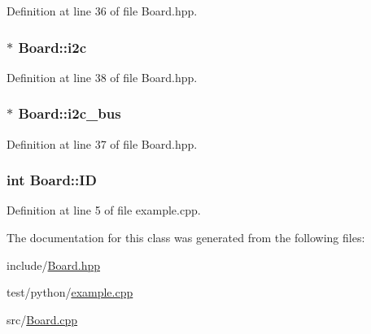 Definition at line 36 of file Board.\+hpp.

\subsubsection[{\texorpdfstring{i2c}{i2c}}]{$\ast$ Board\+::i2c\hspace{0.3cm}{\ttfamily [protected]}}\hypertarget{class_board_aec7b3a540a138062fc54587e1040d917}{}\label{class_board_aec7b3a540a138062fc54587e1040d917}


Definition at line 38 of file Board.\+hpp.

\subsubsection[{\texorpdfstring{i2c\+\_\+bus}{i2c_bus}}]{$\ast$ Board\+::i2c\+\_\+bus\hspace{0.3cm}{\ttfamily [protected]}}\hypertarget{class_board_a4458164bae62e6ba213a08a767242f9f}{}\label{class_board_a4458164bae62e6ba213a08a767242f9f}


Definition at line 37 of file Board.\+hpp.

\subsubsection[{\texorpdfstring{ID}{ID}}]{\setlength{\rightskip}{0pt plus 5cm}int Board\+::\+ID}\hypertarget{class_board_ac537a3646d93996bcf1c0ead77cf4ab5}{}\label{class_board_ac537a3646d93996bcf1c0ead77cf4ab5}


Definition at line 5 of file example.\+cpp.



The documentation for this class was generated from the following files\+:\begin{DoxyCompactItemize}
\item 
include/\hyperlink{_board_8hpp}{Board.\+hpp}\item 
test/python/\hyperlink{example_8cpp}{example.\+cpp}\item 
src/\hyperlink{_board_8cpp}{Board.\+cpp}\end{DoxyCompactItemize}
